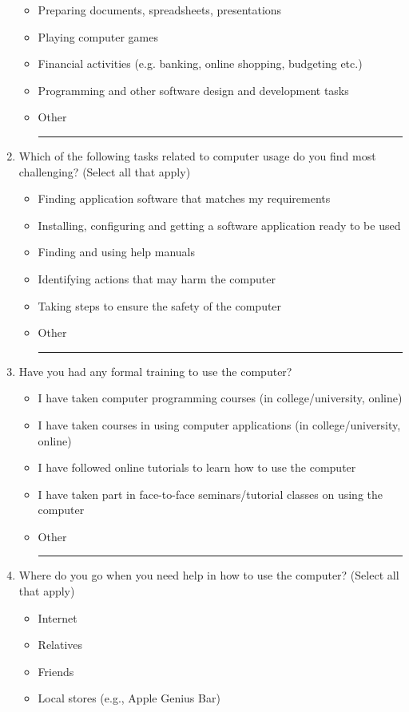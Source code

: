\documentclass[doctor]{thesis} %
\theoremstyle{plain}
\begin{document}
\begin{enumerate}[topsep=-4em]
\begin{itemize}[topsep=-6em, label={o}]
\item Preparing documents, spreadsheets, presentations
\item Playing computer games
\item Financial activities (e.g. banking, online shopping, budgeting etc.)
\item Programming and other software design and development tasks
\item Other \rule{4cm}{0.4pt}
\end{itemize}
\item Which of the following tasks related to computer usage do you find most challenging? (Select all that apply)
\begin{itemize}[topsep=-6em, label={o}]
\itemsep-1em 
\item Finding application software that matches my requirements
\item Installing, configuring and getting a software application ready to be used
\item Finding and using help manuals
\item Identifying actions that may harm the computer
\item Taking steps to ensure the safety of the computer
\item Other \rule{4cm}{0.4pt}
\end{itemize}
\item Have you had any formal training to use the computer?
\begin{itemize}[topsep=-6em, label={o}]
\itemsep-1em 
\item I have taken computer programming courses (in college/university, online)
\item I have taken courses in using computer applications (in college/university, online)
\item I have followed online tutorials to learn how to use the computer
\item I have taken part in face-to-face seminars/tutorial classes on using the computer
\item Other \rule{4cm}{0.4pt}
\end{itemize}
\item Where do you go when you need help in how to use the computer? (Select all that apply)
\begin{itemize}[topsep=-6em, label={o}]
\itemsep-1em 
\item Internet
\item Relatives
\item Friends
\item Local stores (e.g., Apple Genius Bar)

\end{itemize}
\end{enumerate}
\end{document}
